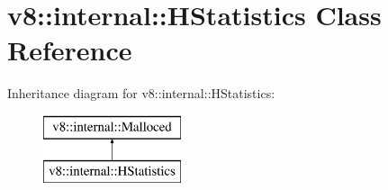 \hypertarget{classv8_1_1internal_1_1_h_statistics}{}\section{v8\+:\+:internal\+:\+:H\+Statistics Class Reference}
\label{classv8_1_1internal_1_1_h_statistics}
Inheritance diagram for v8\+:\+:internal\+:\+:H\+Statistics\+:\begin{figure}[H]
\begin{center}
\leavevmode
\includegraphics[height=2.000000cm]{classv8_1_1internal_1_1_h_statistics}
\end{center}
\end{figure}

